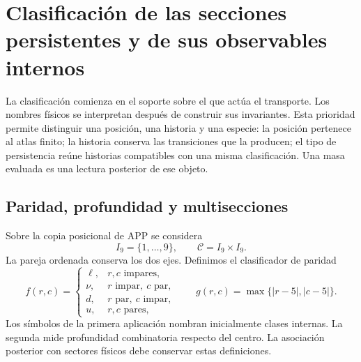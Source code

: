 \section{Clasificación de las secciones persistentes y de sus observables internos}
\label{vi:vi:sec:atlas}

La clasificación comienza en el soporte sobre el que actúa el transporte.
Los nombres físicos se interpretan después de construir sus invariantes.
Esta prioridad permite distinguir una posición, una historia y una especie:
la posición pertenece al atlas finito; la historia conserva las transiciones
que la producen; el tipo de persistencia reúne historias compatibles con una
misma clasificación. Una masa evaluada es una lectura posterior de ese objeto.

\subsection{Paridad, profundidad y multisecciones}

Sobre la copia posicional de APP se considera
\[
 I_9=\{1,\ldots,9\},\qquad \mathcal C=I_9\times I_9.
\]
La pareja ordenada conserva los dos ejes. Definimos el clasificador de paridad
\[
 f(r,c)=
 \begin{cases}
 \ell,&r,c\text{ impares},\\
 \nu,&r\text{ impar},\ c\text{ par},\\
 d,&r\text{ par},\ c\text{ impar},\\
 u,&r,c\text{ pares},
 \end{cases}
 \qquad g(r,c)=\max\{|r-5|,|c-5|\}.
\]
Los símbolos de la primera aplicación nombran inicialmente clases internas.
La segunda mide profundidad combinatoria respecto del centro. La asociación
posterior con sectores físicos debe conservar estas definiciones.


